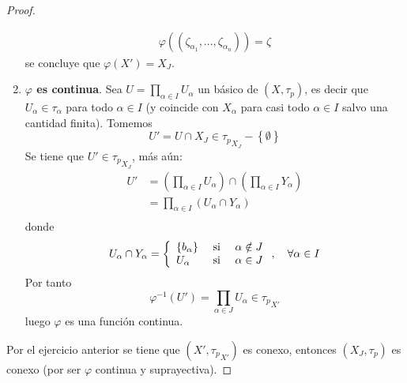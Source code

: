 \documentclass[12pt]{report}
\theoremstyle{largebreak}
\begin{document}
\begin{proof}
\begin{enumerate}
            \begin{equation*}
                \begin{split}
                    \varphi((\zeta_{\alpha_1},...,\zeta_{\alpha_n}))=\zeta
                \end{split}
            \end{equation*}
            se concluye que $\varphi(X')=X_J$.
            \item \textbf{$\varphi$ es continua}. Sea $U=\prod_{\alpha\in I}U_\alpha$ un básico de $(X,\tau_p)$, es decir que $U_\alpha\in\tau_\alpha$ para todo $\alpha\in I$ (y coincide con $X_\alpha$ para casi todo $\alpha\in I$ salvo una cantidad finita). Tomemos
            \begin{equation*}
                U'=U\cap X_J\in {\tau_p}_{ X_J}-\left\{\emptyset \right\}
            \end{equation*}
            Se tiene que $U'\in{\tau_p}_{X_J}$, más aún:
            \begin{equation*}
                \begin{split}
                    U'&=\left(\prod_{\alpha\in I}U_\alpha \right)\cap\left(\prod_{\alpha\in I}Y_\alpha \right)\\
                    &=\prod_{\alpha\in I}(U_\alpha\cap Y_\alpha)\\
                \end{split}
            \end{equation*}
            donde
            \begin{equation*}
                U_\alpha\cap Y_\alpha=\left\{
                    \begin{array}{lcr}
                        \left\{b_\alpha\right\} & \textup{ si } & \alpha\notin J\\
                        U_\alpha & \textup{ si } & \alpha\in J\\
                    \end{array}
                \right.,\quad\forall \alpha\in I
            \end{equation*}
            Por tanto
            \begin{equation*}
                \varphi^{-1}(U')=\prod_{\alpha\in J}U_\alpha\in{\tau_p}_{X'}
            \end{equation*}
            luego $\varphi$ es una función continua.
        \end{enumerate}
        Por el ejercicio anterior se tiene que $(X',{\tau_p}_{X'})$ es conexo, entonces $(X_J,\tau_p)$ es conexo (por ser $\varphi$ continua y suprayectiva).


\end{proof}
\end{document}
